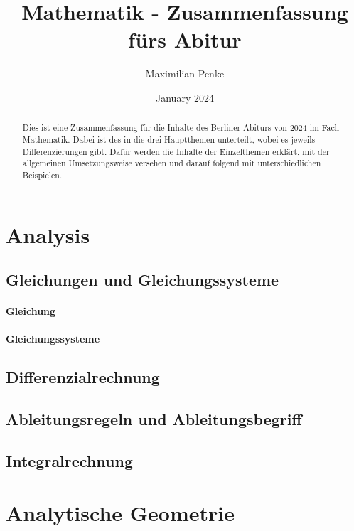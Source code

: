 \documentclass{article}
\title{Mathematik - Zusammenfassung fürs Abitur}
\author{Maximilian Penke}
\date{January 2024}
\begin{document}
    \maketitle

    \begin{abstract}
        Dies ist eine Zusammenfassung für die Inhalte des Berliner Abiturs von 2024 im Fach Mathematik. Dabei ist des in die drei Hauptthemen unterteilt, wobei es jeweils Differenzierungen gibt. Dafür werden die Inhalte der Einzelthemen erklärt, mit der allgemeinen Umsetzungsweise versehen und darauf folgend mit unterschiedlichen Beispielen.
    \end{abstract}

    \tableofcontents

    \section{Analysis}
        \subsection{Gleichungen und Gleichungssysteme}
        \paragraph{Gleichung}
        \paragraph{Gleichungssysteme}
        \subsection{Differenzialrechnung}
        \paragraph{}
        \subsection{Ableitungsregeln und Ableitungsbegriff}
        \subsection{Integralrechnung}

    \section{Analytische Geometrie}
\end{document}
